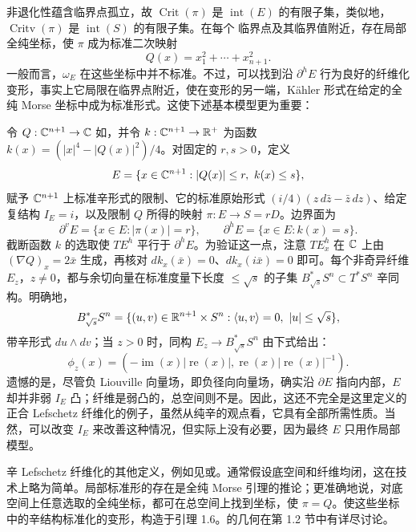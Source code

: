 非退化性蕴含临界点孤立，故 $\operatorname{Crit}(\pi)$ 是 $\operatorname{int}(E)$ 的有限子集，类似地，$\operatorname{Critv}(\pi)$ 是 $\operatorname{int}(S)$ 的有限子集。在每个
临界点及其临界值附近，存在局部全纯坐标，使 $\pi$ 成为标准二次映射
\begin{equation}\label{eq:15.9}
Q(x)=x_1^2+\cdots+x_{n+1}^2.
\end{equation}
一般而言，$\omega_E$ 在这些坐标中并不标准。不过，可以找到沿 $\partial^hE$ 行为良好的纤维化变形，事实上它局限在临界点附近，使在变形的另一端，Kähler 形式在给定的全纯 Morse 坐标中成为标准形式。这使下述基本模型更为重要：

\begin{example}\label{st:15.4}
令 $Q:\mathbb C^{n+1}\to\mathbb C$ 如，并令 $k:\mathbb C^{n+1}\to\mathbb R^+$ 为函数 $k(x)=(|x|^4-|Q(x)|^2)/4$。对固定的 $r,s>0$，定义
\begin{equation}\label{eq:15.10}
E=\{x\in\mathbb C^{n+1}:|Q(x)|\leq r,\ k(x)\leq s\},
\end{equation}
赋予 $\mathbb C^{n+1}$ 上标准辛形式的限制、它的标准原始形式 $(i/4)(z\,d\bar z-\bar z\,dz)$、给定复结构 $I_E=i$，以及限制 $Q$ 所得的映射 $\pi:E\to S=rD$。边界面为
\[
\partial^vE=\{x\in E:|\pi(x)|=r\},\qquad
\partial^hE=\{x\in E:k(x)=s\}.
\]
截断函数 $k$ 的选取使 $TE^h$ 平行于 $\partial^hE$。为验证这一点，注意 $TE_x^h$ 在 $\mathbb C$ 上由 $(\nabla Q)_x=2\bar x$ 生成，再核对 $dk_x(\bar x)=0$、$dk_x(i\bar x)=0$ 即可。每个非奇异纤维 $E_z$，$z\ne0$，都与余切向量在标准度量下长度 $\leq\sqrt{s}$ 的子集 $B_{\sqrt{s}}^*S^n\subset T^*S^n$ 辛同构。明确地，
\[
B_{\sqrt{s}}^*S^n=\{(u,v)\in\mathbb R^{n+1}\times S^n:
\langle u,v\rangle=0,\ |u|\leq\sqrt{s}\},
\]
带辛形式 $du\wedge dv$；当 $z>0$ 时，同构 $E_z\to B_{\sqrt{s}}^*S^n$ 由下式给出：
\[
\phi_z(x)=(-\operatorname{im}(x)|\operatorname{re}(x)|,
\operatorname{re}(x)|\operatorname{re}(x)|^{-1}).
\]
遗憾的是，尽管负 Liouville 向量场，即负径向向量场，确实沿 $\partial E$ 指向内部，$E$ 却并非弱 $I_E$ 凸；纤维是弱凸的，总空间则不是。因此，这还不完全是这里定义的正合 Lefschetz 纤维化的例子，虽然从纯辛的观点看，它具有全部所需性质。当然，可以改变 $I_E$ 来改善这种情况，但实际上没有必要，因为最终 $E$ 只用作局部模型。
\end{example}

\begin{note}\label{st:15.5}
辛 Lefschetz 纤维化的其他定义，例如见或。通常假设底空间和纤维均闭，这在技术上略为简单。局部标准形的存在是全纯 Morse 引理的推论；更准确地说，对底空间上任意选取的全纯坐标，都可在总空间上找到坐标，使 $\pi=Q$。使这些坐标中的辛结构标准化的变形，构造于引理 1.6。的几何在第 1.2 节中有详尽讨论。
\end{note}
